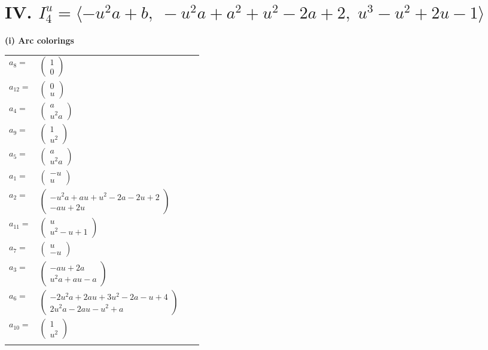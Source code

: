 \documentclass[1p]{elsarticle_modified}
\theoremstyle{definition}
\begin{document}
\centering \section*{IV. $I^u_{4}= \langle - u^2 a+b,\;- u^2 a+a^2+u^2-2 a+2,\;u^3- u^2+2 u-1 \rangle$}
\flushleft \textbf{(i) Arc colorings}\\
\begin{tabular}{m{7pt} m{180pt} m{7pt} m{180pt} }
\flushright $a_{8}=$&$\begin{pmatrix}1\\0\end{pmatrix}$ \\
\flushright $a_{12}=$&$\begin{pmatrix}0\\u\end{pmatrix}$ \\
\flushright $a_{4}=$&$\begin{pmatrix}a\\u^2 a\end{pmatrix}$ \\
\flushright $a_{9}=$&$\begin{pmatrix}1\\u^2\end{pmatrix}$ \\
\flushright $a_{5}=$&$\begin{pmatrix}a\\u^2 a\end{pmatrix}$ \\
\flushright $a_{1}=$&$\begin{pmatrix}- u\\u\end{pmatrix}$ \\
\flushright $a_{2}=$&$\begin{pmatrix}- u^2 a+a u+u^2-2 a-2 u+2\\- a u+2 u\end{pmatrix}$ \\
\flushright $a_{11}=$&$\begin{pmatrix}u\\u^2- u+1\end{pmatrix}$ \\
\flushright $a_{7}=$&$\begin{pmatrix}u\\- u\end{pmatrix}$ \\
\flushright $a_{3}=$&$\begin{pmatrix}- a u+2 a\\u^2 a+a u- a\end{pmatrix}$ \\
\flushright $a_{6}=$&$\begin{pmatrix}-2 u^2 a+2 a u+3 u^2-2 a- u+4\\2 u^2 a-2 a u- u^2+a\end{pmatrix}$ \\
\flushright $a_{10}=$&$\begin{pmatrix}1\\u^2\end{pmatrix}$\\&\end{tabular}
\end{document}
